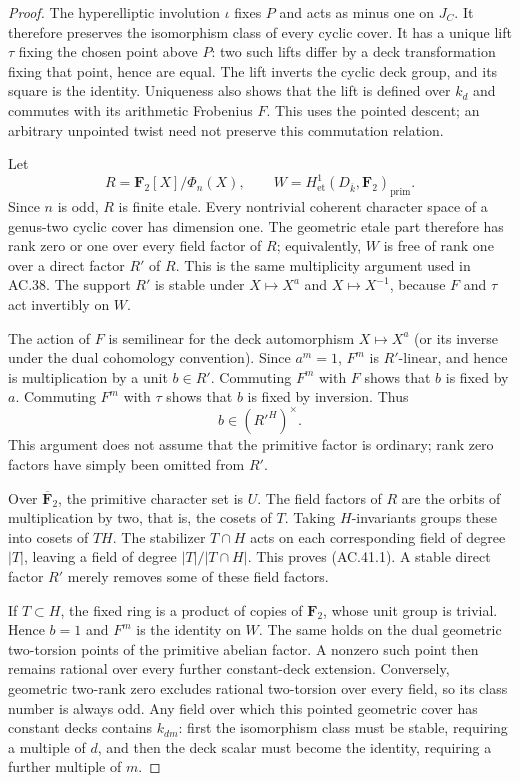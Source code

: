 \begin{proof}
The hyperelliptic involution $\iota$ fixes $P$ and acts
as minus one on $J_C$. It therefore preserves the
isomorphism class of every cyclic cover. It has a
unique lift $\tau$ fixing the chosen point above $P$:
two such lifts differ by a deck transformation fixing
that point, hence are equal. The lift inverts the
cyclic deck group, and its square is the identity.
Uniqueness also shows that the lift is defined over
$k_d$ and commutes with its arithmetic Frobenius $F$.
This uses the pointed descent; an arbitrary unpointed
twist need not preserve this commutation relation.

Let
\[
 R=\mathbf F_2[X]/\Phi_n(X),\qquad
 W=H^1_{\mathrm{et}}(D_{\overline k},\mathbf F_2)_{\mathrm{prim}}.
\]
Since $n$ is odd, $R$ is finite etale. Every nontrivial
coherent character space of a genus-two cyclic cover
has dimension one. The geometric etale part therefore
has rank zero or one over every field factor of $R$;
equivalently, $W$ is free of rank one over a direct
factor $R'$ of $R$. This is the same multiplicity
argument used in AC.38. The support $R'$ is stable
under $X\mapsto X^a$ and $X\mapsto X^{-1}$, because
$F$ and $\tau$ act invertibly on $W$.

The action of $F$ is semilinear for the deck
automorphism $X\mapsto X^a$ (or its inverse under the
dual cohomology convention). Since $a^m=1$, $F^m$ is
$R'$-linear, and hence is multiplication by a unit
$b\in R'$. Commuting $F^m$ with $F$ shows that
$b$ is fixed by $a$. Commuting $F^m$ with $\tau$
shows that $b$ is fixed by inversion. Thus
\[
                         b\in(R'^H)^\times.           \tag{AC.41.3}
\]
This argument does not assume that the primitive
factor is ordinary; rank zero factors have simply
been omitted from $R'$.

Over $\overline{\mathbf F}_2$, the primitive character
set is $U$. The field factors of $R$ are the orbits
of multiplication by two, that is, the cosets of $T$.
Taking $H$-invariants groups these into cosets of $TH$.
The stabilizer $T\cap H$ acts on each corresponding
field of degree $|T|$, leaving a field of degree
$|T|/|T\cap H|$. This proves (AC.41.1). A stable
direct factor $R'$ merely removes some of these
field factors.

If $T\subset H$, the fixed ring is a product of copies
of $\mathbf F_2$, whose unit group is trivial. Hence
$b=1$ and $F^m$ is the identity on $W$. The same holds
on the dual geometric two-torsion points of the
primitive abelian factor. A nonzero such point then
remains rational over every further constant-deck
extension. Conversely, geometric two-rank zero
excludes rational two-torsion over every field, so
its class number is always odd. Any field over which
this pointed geometric cover has constant decks
contains $k_{dm}$: first the isomorphism class must
be stable, requiring a multiple of $d$, and then
the deck scalar must become the identity, requiring
a further multiple of $m$.


\end{proof}
